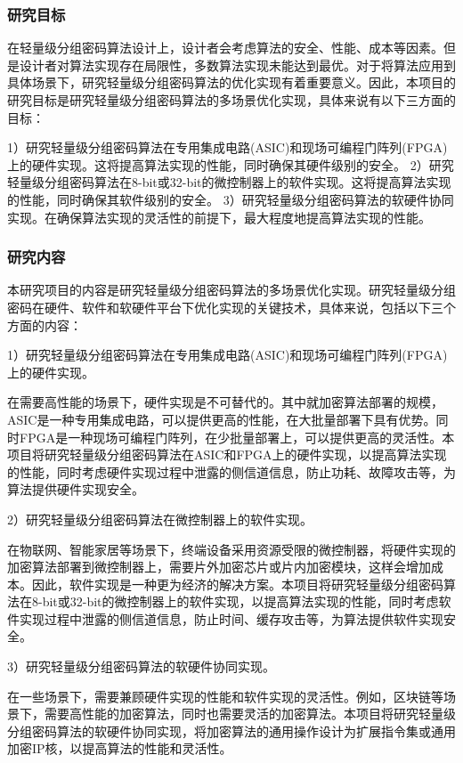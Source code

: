 \documentclass{ctexart}
\begin{document}
\subsubsection{研究目标}
在轻量级分组密码算法设计上，设计者会考虑算法的安全、性能、成本等因素。但是设计者对算法实现存在局限性，多数算法实现未能达到最优。对于将算法应用到具体场景下，研究轻量级分组密码算法的优化实现有着重要意义。因此，本项目的研究目标是研究轻量级分组密码算法的多场景优化实现，具体来说有以下三方面的目标：

1）研究轻量级分组密码算法在专用集成电路(ASIC)和现场可编程门阵列(FPGA)上的硬件实现。这将提高算法实现的性能，同时确保其硬件级别的安全。
2）研究轻量级分组密码算法在8-bit或32-bit的微控制器上的软件实现。这将提高算法实现的性能，同时确保其软件级别的安全。
3）研究轻量级分组密码算法的软硬件协同实现。在确保算法实现的灵活性的前提下，最大程度地提高算法实现的性能。

\subsubsection{研究内容}

本研究项目的内容是研究轻量级分组密码算法的多场景优化实现。研究轻量级分组密码在硬件、软件和软硬件平台下优化实现的关键技术，具体来说，包括以下三个方面的内容：

1）研究轻量级分组密码算法在专用集成电路(ASIC)和现场可编程门阵列(FPGA)上的硬件实现。

在需要高性能的场景下，硬件实现是不可替代的。其中就加密算法部署的规模，ASIC是一种专用集成电路，可以提供更高的性能，在大批量部署下具有优势。同时FPGA是一种现场可编程门阵列，在少批量部署上，可以提供更高的灵活性。本项目将研究轻量级分组密码算法在ASIC和FPGA上的硬件实现，以提高算法实现的性能，同时考虑硬件实现过程中泄露的侧信道信息，防止功耗、故障攻击等，为算法提供硬件实现安全。

2）研究轻量级分组密码算法在微控制器上的软件实现。

在物联网、智能家居等场景下，终端设备采用资源受限的微控制器，将硬件实现的加密算法部署到微控制器上，需要片外加密芯片或片内加密模块，这样会增加成本。因此，软件实现是一种更为经济的解决方案。本项目将研究轻量级分组密码算法在8-bit或32-bit的微控制器上的软件实现，以提高算法实现的性能，同时考虑软件实现过程中泄露的侧信道信息，防止时间、缓存攻击等，为算法提供软件实现安全。

3）研究轻量级分组密码算法的软硬件协同实现。

在一些场景下，需要兼顾硬件实现的性能和软件实现的灵活性。例如，区块链等场景下，需要高性能的加密算法，同时也需要灵活的加密算法。本项目将研究轻量级分组密码算法的软硬件协同实现，将加密算法的通用操作设计为扩展指令集或通用加密IP核，以提高算法的性能和灵活性。
\end{document}
